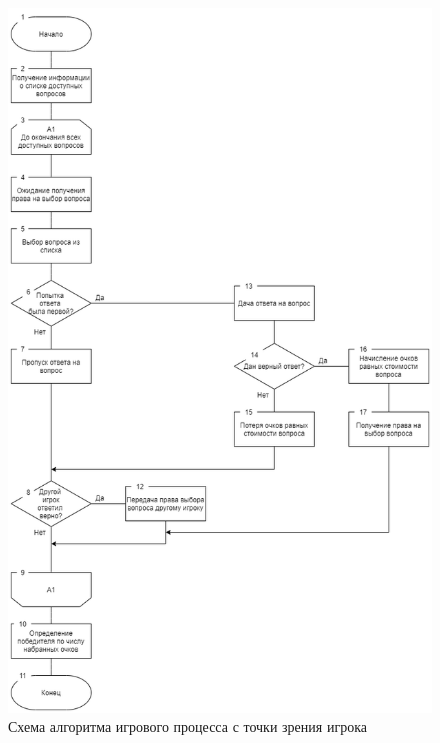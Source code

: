 \begin{figure}
\centering
	\includegraphics[scale=0.5]{attachments/game_player_alg.png}
	\caption{Схема алгоритма игрового процесса с точки зрения игрока}
	\label{fig:domain:model:game:player_alg}
\end{figure}

